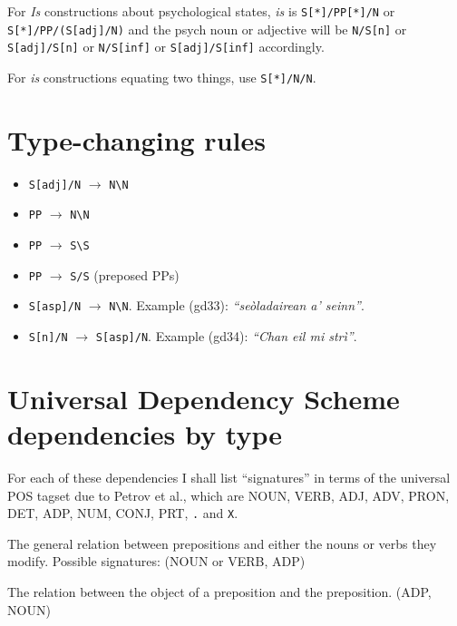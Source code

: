 \documentclass[a4paper]{article}
\begin{document}
 For \textit{Is} constructions about psychological states, \textit{is} is \texttt{S[*]/PP[*]/N} or \texttt{S[*]/PP/(S[adj]/N)} and the psych noun or adjective will be \texttt{N/S[n]} or \texttt{S[adj]/S[n]} or \texttt{N/S[inf]} or \texttt{S[adj]/S[inf]} accordingly.

 For \textit{is} constructions equating two things, use \texttt{S[*]/N/N}. 

\section{Type-changing rules}



\begin{itemize}
\item \texttt{S[adj]/N} $\rightarrow$ \texttt{N\textbackslash N}
\item \texttt{PP} $\rightarrow$ \texttt{N\textbackslash N}
\item \texttt{PP} $\rightarrow$ \texttt{S\textbackslash S}
\item \texttt{PP} $\rightarrow$ \texttt{S/S} (preposed PPs)
\item \texttt{S[asp]/N} $\rightarrow$ \texttt{N\textbackslash N}. Example (gd33): \textit{``se\`oladairean a' seinn''}.
\item \texttt{S[n]/N} $\rightarrow$ \texttt{S[asp]/N}. Example (gd34): \textit{``Chan eil mi str\`i''}.
\end{itemize}














\section{Universal Dependency Scheme dependencies by type}

 For each of these dependencies I shall list ``signatures'' in terms of the universal POS tagset due to Petrov et al., which are NOUN, VERB, ADJ, ADV, PRON, DET, ADP, NUM, CONJ, PRT, \texttt{.} and \texttt{X}.

 The general relation between prepositions and either the nouns or verbs they modify. Possible signatures: (NOUN or VERB, ADP)

 The relation between the object of a preposition and the preposition. (ADP, NOUN)
\end{document}
